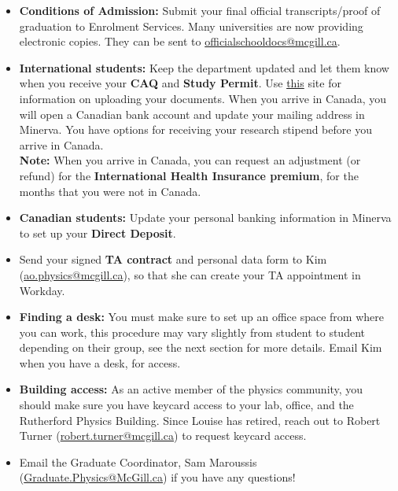 \begin{itemize}[
    label={$\square$},
    leftmargin=1.8em,
    itemsep=1em
]
    \item \textbf{Conditions of Admission:} Submit your final official transcripts/proof of graduation to Enrolment Services. Many universities are now providing electronic copies. They can be sent to \href{mailto:officialschooldocs@mcgill.ca}{officialschooldocs@mcgill.ca}.

    \item \textbf{International students:}  Keep the department updated and let them know when you receive your \textbf{CAQ} and \textbf{Study Permit}. Use \href{https://www.mcgill.ca/legaldocuments/how}{this} site for information on uploading your documents. When you arrive in Canada, you will open a Canadian bank account and update your mailing address in Minerva. You have options for receiving your research stipend before you arrive in Canada. \\    

    \textbf{\color{ocre}Note:} When you arrive in Canada, you can request an adjustment (or refund) for the \textbf{International Health Insurance premium}, for the months that you were not in Canada. 

    \item \textbf{Canadian students:} Update your personal banking information in Minerva to set up your \textbf{Direct Deposit}. 
    
    \item Send your signed \textbf{TA contract} and personal data form to Kim (\href{mailto:ao.physics@mcgill.ca}{ao.physics@mcgill.ca}), so that she can create your TA appointment in Workday.

     \item \textbf{Finding a desk:} You must make sure to set up an office space from where you can work, this procedure may vary slightly from student to student depending on their group, see the next section for more details. Email Kim when you have a desk, for access.
     
     \item \textbf{Building access:} As an active member of the physics community, you should make sure you have keycard access to your lab, office, and the Rutherford Physics Building. Since Louise has retired, reach out to Robert Turner (\href{mailto:robert.turner@mcgill.ca}{robert.turner@mcgill.ca}) to request keycard access.

    \item Email the Graduate Coordinator, Sam Maroussis (\href{mailto:Graduate.Physics@McGill.ca}{Graduate.Physics@McGill.ca}) if you have any questions!

\end{itemize}


